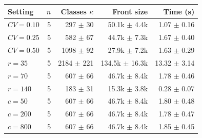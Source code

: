 \begin{tabular}{@{}lrrrr@{}}
\toprule
Setting & $n$ & Classes $\kappa$ & Front size & Time (s) \\
\midrule
$CV=0.10$ & 5 & 297 $\pm$ 30 & 50.1k $\pm$ 4.4k & 1.07 $\pm$ 0.16 \\
$CV=0.25$ & 5 & 582 $\pm$ 67 & 44.7k $\pm$ 7.3k & 1.67 $\pm$ 0.40 \\
$CV=0.50$ & 5 & 1098 $\pm$ 92 & 27.9k $\pm$ 7.2k & 1.63 $\pm$ 0.29 \\
$r=35$ & 5 & 2184 $\pm$ 221 & 134.5k $\pm$ 16.3k & 13.32 $\pm$ 3.14 \\
$r=70$ & 5 & 607 $\pm$ 66 & 46.7k $\pm$ 8.4k & 1.78 $\pm$ 0.46 \\
$r=140$ & 5 & 183 $\pm$ 31 & 15.3k $\pm$ 3.8k & 0.28 $\pm$ 0.07 \\
$c=50$ & 5 & 607 $\pm$ 66 & 46.7k $\pm$ 8.4k & 1.80 $\pm$ 0.48 \\
$c=200$ & 5 & 607 $\pm$ 66 & 46.7k $\pm$ 8.4k & 1.78 $\pm$ 0.47 \\
$c=800$ & 5 & 607 $\pm$ 66 & 46.7k $\pm$ 8.4k & 1.85 $\pm$ 0.45 \\
\bottomrule
\end{tabular}
